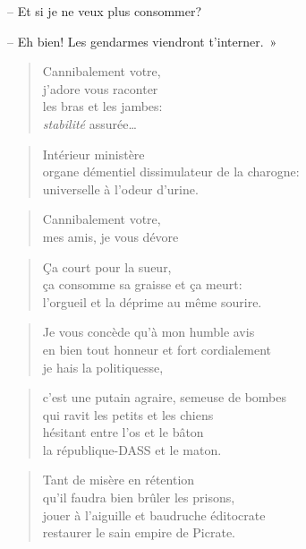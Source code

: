   -- Et si je ne veux plus consommer?
  
  -- Eh bien! Les gendarmes viendront t’interner.~»

  \begin{verse}
    Cannibalement votre,\\
    j’adore vous raconter\\
    les bras et les jambes:\\
    \emph{stabilité} assurée…
  \end{verse}
  \begin{verse}
    Intérieur ministère\\
    organe démentiel dissimulateur de la charogne:\\
    universelle à l’odeur d’urine.
  \end{verse}
  \begin{verse}
    Cannibalement votre,\\
    mes amis, je vous dévore
  \end{verse}
  \begin{center}

  \end{center}
  \begin{verse}
    Ça court pour la sueur,\\
    ça consomme sa graisse et ça meurt:\\
    l’orgueil et la déprime au même sourire.
  \end{verse}

  \begin{verse}
    Je vous concède qu’à mon humble avis\\
    en bien tout honneur et fort cordialement\\
    je hais la politiquesse,
  \end{verse}
  \begin{verse}
    c’est une putain agraire, semeuse de bombes\\
    qui ravit les petits et les chiens\\
    hésitant entre l’os et le bâton\\
    la république-DASS et le maton.
  \end{verse}
  \begin{verse}
    Tant de misère en rétention\\
    qu’il faudra bien brûler les prisons,\\
    jouer à l’aiguille et baudruche éditocrate\\
    restaurer le sain empire de Picrate.
  \end{verse}

